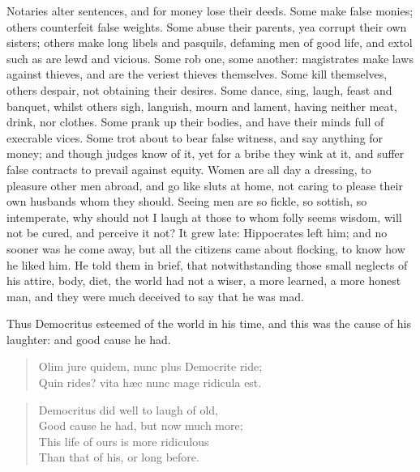 {Notaries alter sentences, and for money lose their deeds. Some make
false monies; others counterfeit false weights. Some abuse their
parents, yea corrupt their own sisters; others make long libels and
pasquils, defaming men of good life, and extol such as are lewd and
vicious. Some rob one, some another: magistrates make laws against
thieves, and are the veriest thieves themselves. Some kill themselves,
others despair, not obtaining their desires. Some dance, sing, laugh,
feast and banquet, whilst others sigh, languish, mourn and lament,
having neither meat, drink, nor clothes. Some prank up their
bodies, and have their minds full of execrable vices. Some trot about
to bear false witness, and say anything for money; and though
judges know of it, yet for a bribe they wink at it, and suffer false
contracts to prevail against equity. Women are all day a dressing, to
pleasure other men abroad, and go like sluts at home, not caring to
please their own husbands whom they should. Seeing men are so fickle,
so sottish, so intemperate, why should not I laugh at those to whom
folly seems wisdom, will not be cured, and perceive it not?
It grew late: Hippocrates left him; and no sooner was he come away, but
all the citizens came about flocking, to know how he liked him. He told
them in brief, that notwithstanding those small neglects of his attire,
body, diet, the world had not a wiser, a more learned, a more
honest man, and they were much deceived to say that he was mad.

Thus Democritus esteemed of the world in his time, and this was the
cause of his laughter: and good cause he had.

\begin{verse}
Olim jure quidem, nunc plus Democrite ride;\\
  Quin rides? vita h\ae{}c nunc mage ridicula est.
\end{verse}


\begin{verse}
Democritus did well to laugh of old,\\
Good cause he had, but now much more;\\

This life of ours is more ridiculous\\
Than that of his, or long before.
\end{verse}

}
